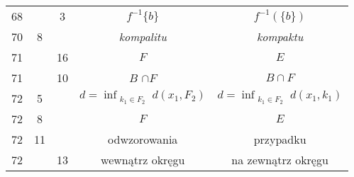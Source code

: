 \documentclass[a4paper,11pt]{article}
\begin{document}
\begin{center}
\begin{tabular}{|c|c|c|c|c|}
    68  & &  3 & $f^{ -1 } \{ b \}$ & $f^{ -1 }( \{ b \} )$ \\
    70  &  8 & & \emph{kompalitu} & \emph{kompaktu} \\
    71  & & 16 & $F$ & $E$ \\
    71  & & 10 & $B$ $\cap F$ & $B \cap F$ \\
    72  &  5 & & $d = \inf_{ \substack{ k_{ 1 } \in F_{ 2 } } } d( x_{ 1 },
                 F_{ 2 } )$
           & $d = \inf_{ \substack{ k_{ 1 } \in F_{ 2 } } }
             d( x_{ 1 }, k_{ 1 } )$ \\
    72  &  8 & & $F$ & $E$ \\
    72  & 11 & & odwzorowania & przypadku \\
    72  & & 13 & wewnątrz okręgu & na zewnątrz okręgu \\
    \hline
  \end{tabular}


\end{center}
\end{document}
